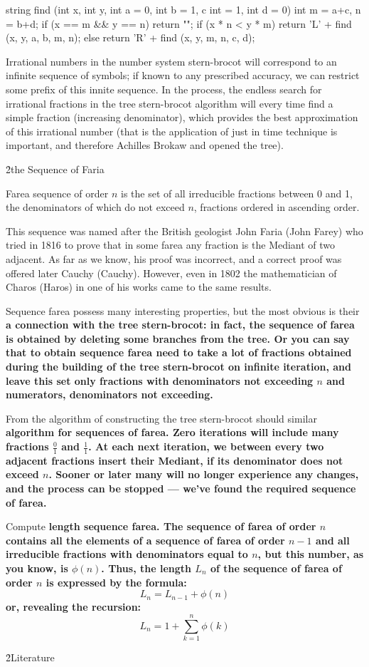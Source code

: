\code
string find (int x, int y, int a = 0, int b = 1, c int = 1, int d = 0) {
int m = a+c, n = b+d;
if (x == m && y == n)
return "";
if (x * n < y * m)
return 'L' + find (x, y, a, b, m, n);
else
return 'R' + find (x, y, m, n, c, d);
}
\endcode

Irrational numbers in the number system stern-brocot will correspond to an infinite sequence of symbols; if known to any prescribed accuracy, we can restrict some prefix of this innite sequence. In the process, the endless search for irrational fractions in the tree stern-brocot algorithm will every time find a simple fraction (increasing denominator), which provides the best approximation of this irrational number (that is the application of just in time technique is important, and therefore Achilles Brokaw and opened the tree).

\h2{the Sequence of Faria}

Farea sequence of order $n$ is the set of all irreducible fractions between 0 and 1, the denominators of which do not exceed $n$, fractions ordered in ascending order.

This sequence was named after the British geologist John Faria (John Farey) who tried in 1816 to prove that in some farea any fraction is the Mediant of two adjacent. As far as we know, his proof was incorrect, and a correct proof was offered later Cauchy (Cauchy). However, even in 1802 the mathematician of Charos (Haros) in one of his works came to the same results.

Sequence farea possess many interesting properties, but the most obvious is their \bf{a connection with the tree stern-brocot}: in fact, the sequence of farea is obtained by deleting some branches from the tree. Or you can say that to obtain sequence farea need to take a lot of fractions obtained during the building of the tree stern-brocot on infinite iteration, and leave this set only fractions with denominators not exceeding $n$ and numerators, denominators not exceeding.

From the algorithm of constructing the tree stern-brocot should similar \bf{algorithm} for sequences of farea. Zero iterations will include many fractions $\frac{0}{1}$ and $\frac{1}{1}$. At each next iteration, we between every two adjacent fractions insert their Mediant, if its denominator does not exceed $n$. Sooner or later many will no longer experience any changes, and the process can be stopped --- we've found the required sequence of farea.

Compute \bf{length} sequence farea. The sequence of farea of order $n$ contains all the elements of a sequence of farea of order $n-1$ and all irreducible fractions with denominators equal to $n$, but this number, as you know, is $\phi(n)$. Thus, the length $L_n$ of the sequence of farea of order $n$ is expressed by the formula:
$$ L_n = L_{n-1} + \phi(n) $$
or, revealing the recursion:
$$ L_n = 1 + \sum_{k=1}^n \phi(k) $$

\h2{Literature}

\ul{
\li {}
}